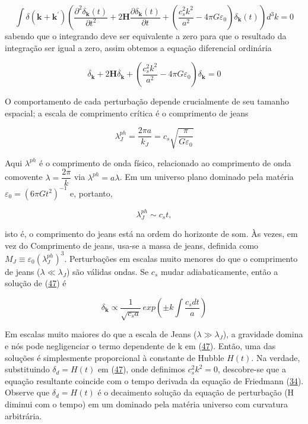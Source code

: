 \documentclass[a4paper,12pt]{article}
\begin{document}
$$\int\delta(\mathbf{k}+\mathbf{k}^\prime)\left(\dfrac{\partial^2\delta_\mathbf{k}(t)}{\partial t^2}+ 2\mathbf{H}\dfrac{\partial\delta_\mathbf{k}(t)}{\partial t} +( \dfrac{c^2_sk^2}{a^2} - 4\pi G\varepsilon_0)\delta_\mathbf{k}(t) \right) d^3k =0 $$
sabendo que o integrando deve ser equivalente a zero para que o resultado da integração ser igual a zero, assim obtemos a equação diferencial ordinária
 
\begin{equation}\label{eq47}
	\ddot{\delta_\mathbf{k}} + 2\mathbf{H}\dot{\delta_\mathbf{k}} + \left( \dfrac{c^2_s k^2}{a^2} -4\pi G\varepsilon_0\right)\delta_\mathbf{k} = 0
\end{equation}

O comportamento de cada perturbação depende crucialmente de seu tamanho espacial; a escala de comprimento crítica é o comprimento de jeans

\begin{equation}\label{eq48}
	\lambda^{ph}_J = \dfrac{2\pi a }{k_J} = c_s\sqrt{\dfrac{\pi}{G\varepsilon_0}}
\end{equation}

Aqui $\lambda^{ph}$ é o comprimento de onda físico, relacionado
ao comprimento de onda comovente $\lambda = \dfrac{2\pi}{k}$ via $\lambda^{ph} = a\lambda$. Em um universo plano dominado pela matéria $\varepsilon_0 = (6\pi G t^2)^{-1}$ e, portanto,

\begin{equation}\label{eq49}
	\lambda_J^{ph} \sim c_s t,
\end{equation}

isto é, o comprimento do jeans está na ordem do horizonte de som. Às vezes, em vez do
Comprimento de jeans, usa-se a massa de jeans, definida como $M_J \equiv\varepsilon_0 (\lambda_J^{ph})^3$.
Perturbações em escalas muito menores do que o comprimento de jeans ($\lambda \ll\lambda_J$) são válidas ondas. Se $c_s$ mudar adiabaticamente, então a solução de (\hyperref[eq47]{47}) é

\begin{equation}\label{eq50}
	\delta_\mathbf{k} \propto \dfrac{1}{\sqrt{c_s a}} \,exp\left( \pm k \int \dfrac{c_s dt}{a}\right)
\end{equation}

Em escalas muito maiores do que a escala de Jeans ($\lambda \gg \lambda_J$), a gravidade domina e nós
pode negligenciar o termo dependente de k em (\hyperref[eq47]{47}). Então, uma das soluções é simplesmente
proporcional à constante de Hubble $H (t)$. Na verdade, substituindo $\delta_d = H (t)$ em (\hyperref[eq47]{47}),
onde definimos $c^2_s k^2 = 0$, descobre-se que a equação resultante coincide com o tempo
derivada da equação de Friedmann (\hyperref[eq34]{34}). Observe que $\delta_d = H (t)$ é o decaimento
solução da equação de perturbação (H diminui com o tempo) em um dominado pela matéria
universo com curvatura arbitrária.
\end{document}
